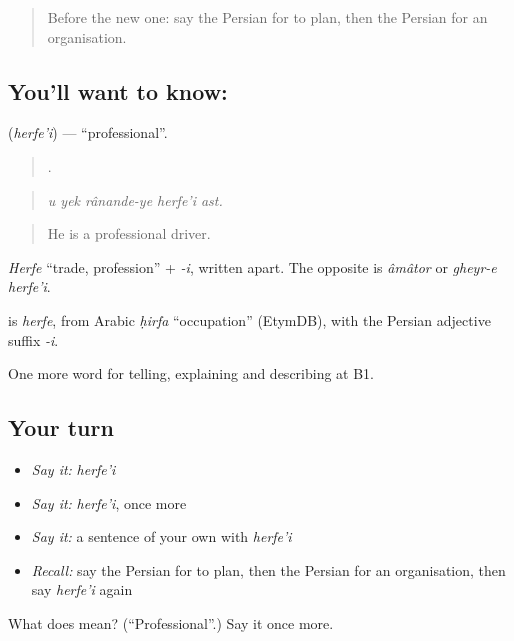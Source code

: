 \begin{quote}
Before the new one: say the Persian for to plan, then the Persian for an organisation.
\end{quote}

\subsection*{You'll want to know:  }
\textbf{ } (\emph{herfe'i}) — \textquotedblleft{}professional\textquotedblright{}.

\begin{quote}
     .
\end{quote}

\begin{quote}
\emph{u yek rânande-ye herfe'i ast.}
\end{quote}

\begin{quote}
He is a professional driver.
\end{quote}

\emph{Herfe} \textquotedblleft{}trade, profession\textquotedblright{} + \emph{-i}, written apart. The opposite is \emph{âmâtor} or \emph{gheyr-e herfe'i}.

\begin{cousinweb}
\textbf{ } is \emph{herfe}, from Arabic \emph{ḥirfa} \textquotedblleft{}occupation\textquotedblright{} (EtymDB), with the Persian adjective suffix \emph{-i}.
\end{cousinweb}

\begin{grammarlens}[title={What you've built}]
One more word for telling, explaining and describing at B1.
\end{grammarlens}

\subsection*{Your turn}
\begin{itemize}
\raggedright
  \item \emph{Say it:} \emph{herfe'i}
  \item \emph{Say it:} \emph{herfe'i}, once more
  \item \emph{Say it:} a sentence of your own with \emph{herfe'i}
  \item \emph{Recall:} say the Persian for to plan, then the Persian for an organisation, then say \emph{herfe'i} again
\end{itemize}

\begin{tcolorbox}[breakable,colback=teal!4,colframe=teal!35!black,title={Before you move on}]
What does   mean? (\textquotedblleft{}Professional\textquotedblright{}.) Say it once more.
\end{tcolorbox}
